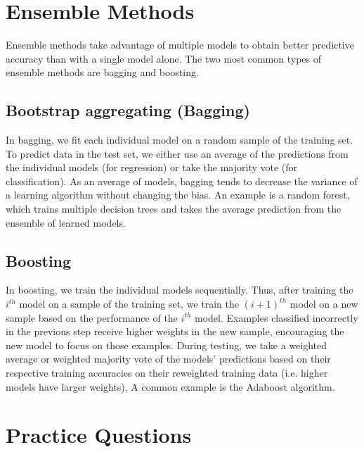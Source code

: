 \documentclass[12pt,letterpaper]{article}
\begin{document}
\section{Ensemble Methods}
Ensemble methods take advantage of multiple models to obtain better predictive accuracy than with a single model alone. The two most common types of ensemble methods are bagging and boosting. 

\subsection{Bootstrap aggregating (Bagging)}
In bagging, we fit each individual model on a random sample of the training set. To predict data in the test set, we either use an average of the predictions from the individual models (for regression) or take the majority vote (for classification). As an average of models, bagging tends to decrease the variance of a learning algorithm without changing the bias. An example is a random forest, which trains multiple decision trees and takes the average prediction from the ensemble of learned models.

\subsection{Boosting}

In boosting, we train the individual models sequentially. Thus, after training the $i^{th}$ model on a sample of the training set, we train the $(i+1)^{th}$ model on a new sample based on the performance of the $i^{th}$ model. Examples classified incorrectly in the previous step receive higher weights in the new sample, encouraging the new model to focus on those examples. During testing, we take a weighted average or weighted majority vote of the models' predictions based on their respective training accuracies on their reweighted training data (i.e. higher models have larger weights). A common example is the Adaboost algorithm.

\newpage

\section{Practice Questions}
\end{document}
